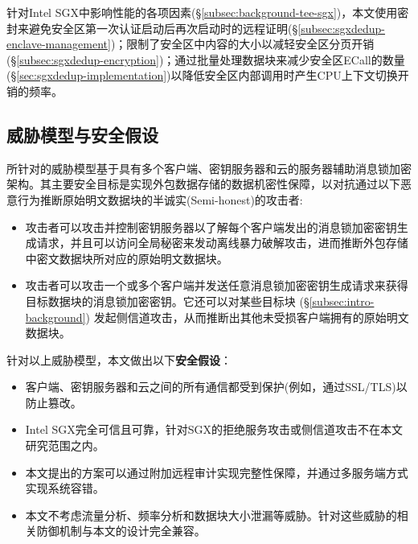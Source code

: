 针对Intel SGX中影响性能的各项因素(\S\ref{subsec:background-tee-sgx})，本文使用密封来避免安全区第一次认证启动后再次启动时的远程证明(\S\ref{subsec:sgxdedup-enclave-management})；限制了安全区中内容的大小以减轻安全区分页开销(\S\ref{subsec:sgxdedup-encryption})；通过批量处理数据块来减少安全区ECall的数量(\S\ref{sec:sgxdedup-implementation})以降低安全区内部调用时产生CPU上下文切换开销的频率。

\subsection{威胁模型与安全假设}
\label{subsec:sgxdedup-threat}

\sysnameS 所针对的威胁模型基于具有多个客户端、密钥服务器和云的服务器辅助消息锁加密架构\cite{bellare2013DupLESS}。其主要安全目标是实现外包数据存储\cite{bellare2013DupLESS}的数据机密性保障，以对抗通过以下恶意行为推断原始明文数据块的半诚实(Semi-honest)的攻击者:

\begin{itemize}[leftmargin=0em]
    \item 攻击者可以攻击并控制密钥服务器以了解每个客户端发出的消息锁加密密钥生成请求，并且可以访问全局秘密来发动离线暴力破解攻击\cite{bellare2013DupLESS}，进而推断外包存储中密文数据块所对应的原始明文数据块。
    \item 攻击者可以攻击一个或多个客户端并发送任意消息锁加密密钥生成请求来获得目标数据块的消息锁加密密钥\cite{bellare2013DupLESS}。它还可以对某些目标块 \cite{harnik2010side} (\S\ref{subsec:intro-background}) 发起侧信道攻击，从而推断出其他未受损客户端拥有的原始明文数据块。
\end{itemize}

针对以上威胁模型，本文做出以下\textbf{安全假设}：

\begin{itemize}[leftmargin=0em]
    \item 客户端、密钥服务器和云之间的所有通信都受到保护(例如，通过SSL/TLS)以防止篡改。
    \item Intel SGX完全可信且可靠，针对SGX的拒绝服务攻击或侧信道攻击\cite{bulck2018FORESHADOW, oleksenko18}不在本文研究范围之内。
    \item 本文提出的方案可以通过附加远程审计\cite{ateniese2007provable, juels2007pors}实现完整性保障，并通过多服务端方式\cite{li15}实现系统容错。
    \item 本文不考虑流量分析\cite{zuo2018mitigating}、频率分析\cite{li2020TED}和数据块大小泄漏\cite{ritzdorf16}等威胁。针对这些威胁的相关防御机制\cite{zuo2018mitigating,li2020TED,ritzdorf16}与本文的设计完全兼容。
\end{itemize}